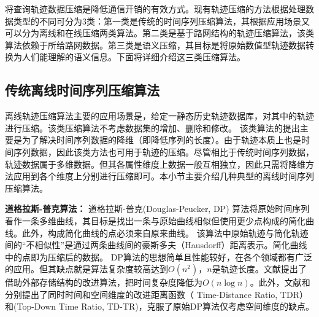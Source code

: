 将查询轨迹数据压缩是降低通信开销的有效方式。现有轨迹压缩的方法根据处理数据类型的不同可分为3类\cite{jiang}：第一类是传统的时间序列压缩算法，其根据应用场景又可以分为离线和在线压缩两类算法。第二类是基于路网结构的轨迹压缩算法，该类算法依赖于所给路网数据。第三类是语义压缩，其目标是将原始数值型轨迹数据转换为人们能理解的语义信息。下面将详细介绍这三类压缩算法。


\subsection{传统离线时间序列压缩算法}
离线轨迹压缩算法主要的应用场景是，给定一静态历史轨迹数据库，对其中的轨迹进行压缩。该类压缩算法不考虑数据集的增加、删除和修改。
该类算法的提出主要是为了解决时间序列数据的降维（即降低序列的长度）。由于轨迹本质上也是时间序列数据，因此该类方法也可用于轨迹的压缩。尽管相比于传统时间序列数据，轨迹数据属于多维数据。但其各属性维度上数据一般互相独立，因此只需将降维方法应用到各个维度上分别进行压缩即可。本小节主要介绍几种典型的离线时间序列压缩算法。

\textbf{道格拉斯-普克算法：}
道格拉斯-普克(Douglas-Peucker, DP) 算法将原始时间序列看作一条多维曲线，其目标是找出一条与原始曲线相似但使用更少点构成的简化曲线。此外，构成简化曲线的点必须来自原来曲线。
该算法中原始轨迹与简化轨迹间的“不相似性”是通过两条曲线间的豪斯多夫（Hausdorff）距离表示。简化曲线中的点即为压缩后的数据。
DP算法的思想简单且性能较好，在各个领域都有广泛的应用。但其缺点就是算法复杂度较高达到$O(n^2)$，$n$是轨迹长度。文献\cite{DPSpeeding}提出了借助外部存储结构的改进算法，把时间复杂度降低为$O(n\log n)$。此外，文献\cite{MeratniaB04}和\cite{LiuZSSKJ15}分别提出了同时时间和空间维度的改进距离函数（ Time-Distance Ratio, TDR）和(Top-Down Time Ratio, TD-TR)，克服了原始DP算法仅考虑空间维度的缺点。


